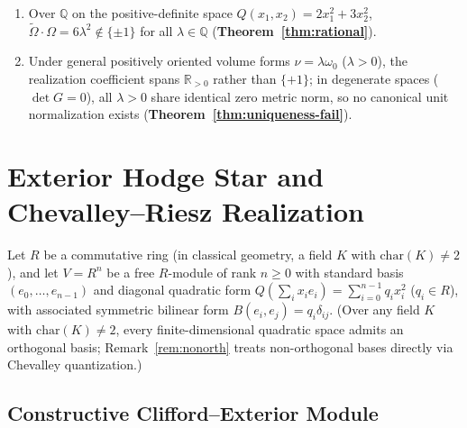\documentclass[11pt]{article}
\theoremstyle{definition}
\begin{document}
\begin{itemize}
\begin{enumerate}
    \item[(c)] Over $\mathbb{Q}$ on the positive-definite space $Q(x_1,x_2) = 2x_1^2 + 3x_2^2$, $\widetilde{\Omega}\cdot\Omega = 6\lambda^2 \notin \{\pm 1\}$ for all $\lambda \in \mathbb{Q}$ (\textbf{Theorem~\ref{thm:rational}}).
    \item[(d)] Under general positively oriented volume forms $\nu = \lambda\omega_0$ ($\lambda > 0$), the realization coefficient spans $\mathbb{R}_{>0}$ rather than $\{+1\}$; in degenerate spaces ($\det G = 0$), all $\lambda > 0$ share identical zero metric norm, so no canonical unit normalization exists (\textbf{Theorem~\ref{thm:uniqueness-fail}}).
  \end{enumerate}
\end{itemize}

\section{Exterior Hodge Star and Chevalley--Riesz Realization}

Let $R$ be a commutative ring (in classical geometry, a field $K$ with $\mathrm{char}(K) \neq 2$), and let $V = R^n$ be a free $R$-module of rank $n \ge 0$ with standard basis $(e_0, \dots, e_{n-1})$ and diagonal quadratic form $Q(\sum_i x_i e_i) = \sum_{i=0}^{n-1} q_i x_i^2$ ($q_i \in R$), with associated symmetric bilinear form $B(e_i, e_j) = q_i \delta_{ij}$. (Over any field $K$ with $\mathrm{char}(K) \neq 2$, every finite-dimensional quadratic space admits an orthogonal basis; Remark~\ref{rem:nonorth} treats non-orthogonal bases directly via Chevalley quantization.)

\subsection{Constructive Clifford--Exterior Module}
\end{document}
